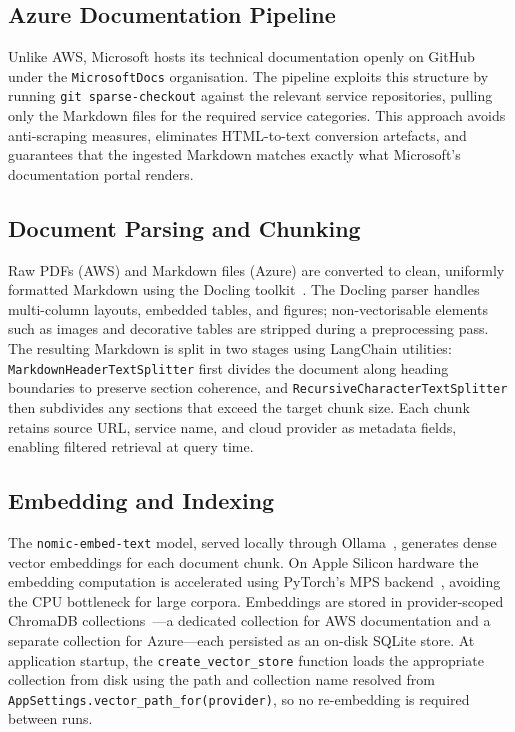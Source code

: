 \subsection{Azure Documentation Pipeline}

Unlike AWS, Microsoft hosts its technical documentation openly on GitHub under the \texttt{MicrosoftDocs} organisation. The pipeline exploits this structure by running \texttt{git sparse-checkout} against the relevant service repositories, pulling only the Markdown files for the required service categories. This approach avoids anti-scraping measures, eliminates HTML-to-text conversion artefacts, and guarantees that the ingested Markdown matches exactly what Microsoft's documentation portal renders.

\subsection{Document Parsing and Chunking}

Raw PDFs (AWS) and Markdown files (Azure) are converted to clean, uniformly formatted Markdown using the Docling toolkit~\cite{docling2025paper, docling2024web}. The Docling parser handles multi-column layouts, embedded tables, and figures; non-vectorisable elements such as images and decorative tables are stripped during a preprocessing pass. The resulting Markdown is split in two stages using LangChain utilities: \texttt{MarkdownHeaderTextSplitter} first divides the document along heading boundaries to preserve section coherence, and \texttt{RecursiveCharacterTextSplitter} then subdivides any sections that exceed the target chunk size. Each chunk retains source URL, service name, and cloud provider as metadata fields, enabling filtered retrieval at query time.

\subsection{Embedding and Indexing}

The \texttt{nomic-embed-text} model, served locally through Ollama~\cite{ollama2024web}, generates dense vector embeddings for each document chunk. On Apple Silicon hardware the embedding computation is accelerated using PyTorch's MPS backend~\cite{apple2024mps}, avoiding the CPU bottleneck for large corpora. Embeddings are stored in provider-scoped ChromaDB collections~\cite{chromadb2024}---a dedicated collection for AWS documentation and a separate collection for Azure---each persisted as an on-disk SQLite store. At application startup, the \texttt{create\_vector\_store} function loads the appropriate collection from disk using the path and collection name resolved from \texttt{AppSettings.vector\_path\_for(provider)}, so no re-embedding is required between runs.


